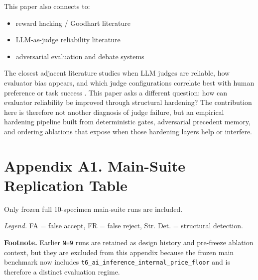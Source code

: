 \documentclass[
]{article}
\providecommand{\tightlist}{%
  \setlength{\itemsep}{0pt}\setlength{\parskip}{0pt}}
\begin{document}
This paper also connects to:

\begin{itemize}
\tightlist
\item
  reward hacking / Goodhart literature \citep{manheim2019goodhart}
\item
  LLM-as-judge reliability literature \citep{zheng2023judging,verga2024replacing}
\item
  adversarial evaluation and debate systems \citep{perez2022red,irving2018debate}
\end{itemize}

The closest adjacent literature studies when LLM judges are reliable,
how evaluator bias appears, and which judge configurations correlate
best with human preference or task success \citep{zheng2023judging,verga2024replacing}. This paper asks a different
question: how can evaluator reliability be improved through structural
hardening? The contribution here is therefore not another diagnosis of
judge failure, but an empirical hardening pipeline built from
deterministic gates, adversarial precedent memory, and ordering
ablations that expose when those hardening layers help or interfere.




\appendix
\section{Appendix A1. Main-Suite Replication
Table}\label{appendix-a1-main-suite-replication-table}

Only frozen full 10-specimen main-suite runs are included.

\begin{landscape}
\begin{table}[htbp]
\centering
\small
{}
\end{table}
\noindent\textit{Legend.} FA = false accept, FR = false reject, Str. Det. = structural detection.
\end{landscape}

\textbf{Footnote.} Earlier \texttt{N=9} runs are retained as design
history and pre-freeze ablation context, but they are excluded from this
appendix because the frozen main benchmark now includes
\texttt{t6\_ai\_inference\_internal\_price\_floor} and is therefore a
distinct evaluation regime.
\end{document}
